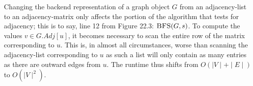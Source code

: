 Changing the backend representation of a graph object $ G $ from an adjacency-list to an adjacency-matrix only affects the portion of the algorithm that tests for adjacency; this is to say, line 12 from Figure 22.3: $ \textsc{BFS}(G,s) $. To compute the values $ v \in G.Adj[u] $, it becomes necessary to scan the entire row of the matrix corresponding to $ u $. This is, in almost all circumstances, worse than scanning the adjacency-list corresponding to $ u $ as such a list will only contain as many entries as there are outward edges from $ u $. The runtime thus shifts from $ O( \mid V \mid + \mid E \mid) $ to $ O( \mid V \mid^2) $.